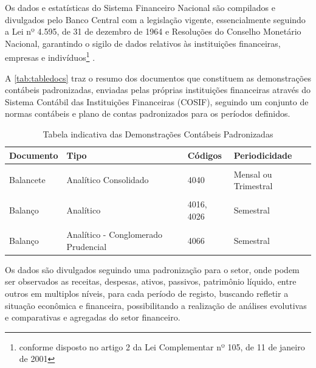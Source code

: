 \documentclass[12pt,12pt,openright,oneside,a4paper,chapter=TITLE,section=TITLE,subsection=TITLE,subsubsection=TITLE,english,french,spanish,portugues,sumario=tradicional]{abntex2}
\begin{document}
Os dados e estatísticas do Sistema Financeiro Nacional são compilados e divulgados pelo Banco Central com a legislação vigente, essencialmente seguindo a Lei nº 4.595, de 31 de dezembro de 1964 e Resoluções do Conselho Monetário Nacional, garantindo o sigilo de dados relativos às instituições financeiras, empresas e indivíduos\footnote{conforme disposto no artigo 2 da Lei Complementar nº 105, de 11 de janeiro de 2001} \cite{sgs:bm}.

A \autoref{tab:tabledocs} traz o resumo dos documentos que constituem as demonstrações contábeis padronizadas, enviadas pelas próprias instituições financeiras através do Sistema Contábil das Instituições Financeiras (COSIF), seguindo um conjunto de normas contábeis e plano de contas padronizados para os períodos definidos.

\begin{table}
\caption{Tabela indicativa das Demonstrações Contábeis Padronizadas}
\begingroup\fontsize{10}{12}\selectfont

\begin{tabu} to 
\toprule
Documento & Tipo & Códigos & Periodicidade\\
\midrule
{} &  &  & \\
Balancete & Analítico Consolidado & 4040 & Mensal ou Trimestral\\
 &  &  & \\
Balanço & Analítico & 4016, 4026 & Semestral\\
 &  &  & \\
\addlinespace
Balanço & Analítico - Conglomerado Prudencial & 4066 & Semestral\\
\bottomrule
\end{tabu}
\endgroup{}
\label{tab:tabledocs}
\end{table}

Os dados são divulgados seguindo uma padronização para o setor, onde podem ser observados as receitas, despesas, ativos, passivos, patrimônio líquido, entre outros em multiplos níveis, para cada período de registo, buscando refletir a situação econômica e financeira, possibilitando a realização de análises evolutivas e comparativas e agregadas do setor financeiro.
\end{document}
